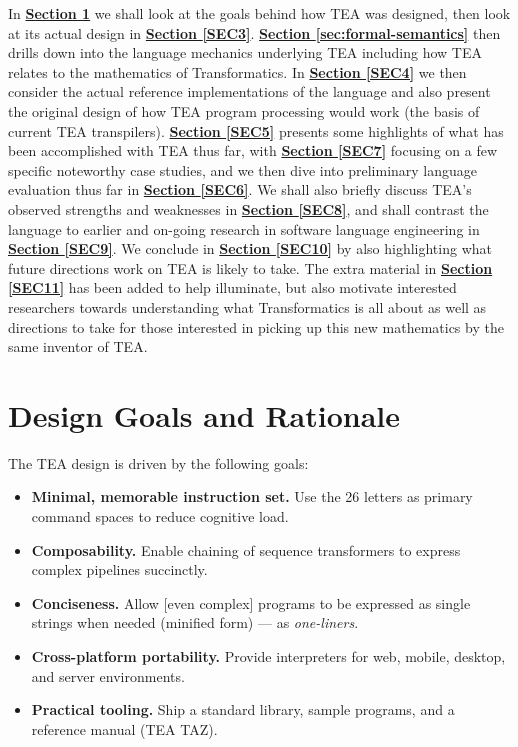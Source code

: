 \documentclass[sigplan,screen]{acmart}
\begin{document}
In \textbf{\hyperref[SEC2]{Section \ref{SEC2}}} we shall look at the goals behind how TEA was designed, then look at its actual design in \textbf{\hyperref[SEC3]{Section \ref{SEC3}}}. \textbf{\hyperref[sec:formal-semantics]{Section \ref{sec:formal-semantics}}} then drills down into the language mechanics underlying TEA including how TEA relates to the mathematics of Transformatics. In \textbf{\hyperref[SEC4]{Section \ref{SEC4}}} we then consider the actual reference implementations of the language and also present the original design of how TEA program processing would work (the basis of current TEA transpilers). \textbf{\hyperref[SEC5]{Section \ref{SEC5}}} presents some highlights of what has been accomplished with TEA thus far, with \textbf{\hyperref[SEC7]{Section \ref{SEC7}}} focusing on a few specific noteworthy case studies, and we then dive into preliminary language evaluation thus far in \textbf{\hyperref[SEC6]{Section \ref{SEC6}}}. We shall also briefly discuss TEA's observed strengths and weaknesses in \textbf{\hyperref[SEC8]{Section \ref{SEC8}}}, and shall contrast the language to earlier and on-going research in software language engineering in \textbf{\hyperref[SEC9]{Section \ref{SEC9}}}. We conclude in \textbf{\hyperref[SEC10]{Section \ref{SEC10}}} by also highlighting what future directions work on TEA is likely to take. The extra material in  \textbf{\hyperref[SEC11]{Section \ref{SEC11}}} has been added to help illuminate, but also motivate interested researchers towards understanding what Transformatics is all about as well as directions to take for those interested in picking up this new mathematics by the same inventor of TEA.



\section{Design Goals and Rationale}
\label{SEC2}
The TEA design is driven by the following goals:

\begin{itemize}
  \item \textbf{Minimal, memorable instruction set.} Use the 26 letters as primary command spaces to reduce cognitive load.
  \item \textbf{Composability.} Enable chaining of sequence transformers \cite{Lutalo2025_transformatics_thesis} to express complex pipelines succinctly.
  \item \textbf{Conciseness.} Allow [even complex] programs to be expressed as single strings when needed (minified form) --- as \textit{one-liners}.
  \item \textbf{Cross-platform portability.} Provide interpreters for web, mobile, desktop, and server environments.
  \item \textbf{Practical tooling.} Ship a standard library, sample programs, and a reference manual (TEA TAZ).
\end{itemize}
\end{document}
